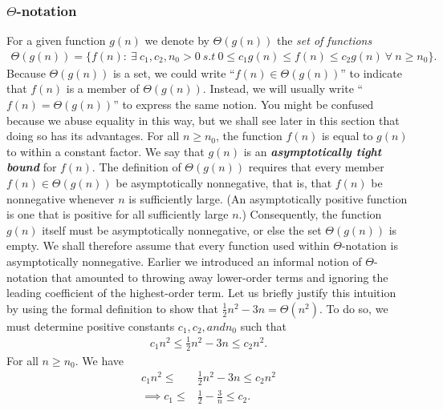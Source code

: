\documentclass{report}
\begin{document}
        \subsubsection{$\Theta$-notation}
        \bigbreak \noindent 
        For a given function $g(n)$ we denote by $\Theta(g(n))$ the \textit{set of functions}
        \begin{align*}
            \Theta(g(n)) = \{f(n):\ \exists\ c_{1}, c_{2}, n_{0} >0  \ s.t \ 0 \leq c_{1}g(n) \leq f(n) \leq c_{2}g(n) \ \forall \ n \geq n_{0} \}
        .\end{align*}
        \bigbreak \noindent 
        \bigbreak \noindent 
        Because \(\Theta(g(n))\) is a set, we could write “\(f(n) \in \Theta(g(n))\)” to indicate that \(f(n)\) is a member of \(\Theta(g(n))\). Instead, we will usually write “\(f(n) = \Theta(g(n))\)” to express the same notion. You might be confused because we abuse equality in this way, but we shall see later in this section that doing so has its advantages.
        \bigbreak \noindent 
        For all  $n \geq n_0$, the function $f(n)$ is equal to $g(n)$ to within a constant factor. We say that $g(n)$ is an \textit{\textbf{asymptotically tight bound}} for $f(n)$.
        \bigbreak \noindent 
        The definition of $\Theta(g(n))$ requires that every member $f(n) \in \Theta(g(n))$ be asymptotically nonnegative, that is, that $f(n)$ be nonnegative whenever $n$ is sufficiently large. (An asymptotically positive function is one that is positive for all sufficiently large $n$.) Consequently, the function $g(n)$ itself must be asymptotically nonnegative, or else the set $\Theta(g(n))$ is empty. We shall therefore assume that every function used within $\Theta$-notation is asymptotically nonnegative.
        \bigbreak \noindent 
        Earlier we introduced an informal notion of $\Theta$-notation that amounted to throwing away lower-order terms and ignoring the leading coefficient of the highest-order term. Let us briefly justify this intuition by using the formal definition to show that $\frac{1}{2}n^{2} -3n = \Theta(n^{2}) $. To do so, we must determine positive constants $c_{1}, c_{2}, and n_{0}$ such that
        \begin{align*}
            c_{1}n^{2} \leq \frac{1}{2}n^{2} - 3n \leq c_{2}n^{2}
        .\end{align*}
        \bigbreak \noindent 
        For all $n \geq n_{0}$. We have
        \begin{align*}
            c_{1}n^{2} \leq &\frac{1}{2}n^{2} - 3n \leq c_{2}n^{2} \\
            \implies c_{1} \leq &\frac{1}{2}-\frac{3}{n} \leq c_{2}
        .\end{align*}
\end{document}
